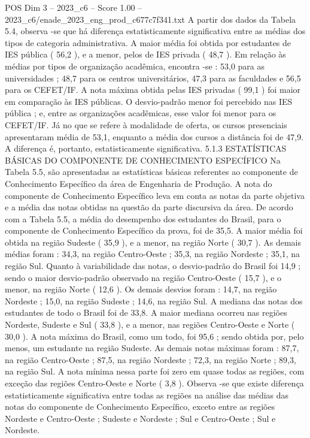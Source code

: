 \begin{textsample}{POS Dim 3 – 2023\_c6 – Score 1.00 – 2023\_c6/enade\_2023\_eng\_prod\_c677c7f341.txt}
A partir dos dados da Tabela 5.4, observa -se que há diferença estatisticamente significativa entre as médias dos tipos de categoria administrativa.
A maior média foi obtida por estudantes de IES pública ( 56,2 ), e a menor, pelos de IES privada ( 48,7 ).
Em relação às médias por tipos de organização acadêmica, encontra -se : 53,0 para as universidades ; 48,7 para os centros universitários, 47,3 para as faculdades e 56,5 para os CEFET/IF.
A nota máxima obtida pelas IES privadas ( 99,1 ) foi maior em comparação às IES públicas.
O desvio-padrão menor foi percebido nas IES pública ; e, entre as organizações acadêmicas, esse valor foi menor para os CEFET/IF.
Já no que se refere à modalidade de oferta, os cursos presenciais apresentaram média de 53,1, enquanto a média dos cursos a distância foi de 47,9.
A diferença é, portanto, estatisticamente significativa. 5.1.3 ESTATÍSTICAS BÁSICAS DO COMPONENTE DE CONHECIMENTO ESPECÍFICO Na Tabela 5.5, são apresentadas as estatísticas básicas referentes ao componente de Conhecimento Específico da área de Engenharia de Produção.
A nota do componente de Conhecimento Específico leva em conta as notas da parte objetiva e a média das notas obtidas na questão da parte discursiva da área.
De acordo com a Tabela 5.5, a média do desempenho dos estudantes do Brasil, para o componente de Conhecimento Específico da prova, foi de 35,5.
A maior média foi obtida na região Sudeste ( 35,9 ), e a menor, na região Norte ( 30,7 ).
As demais médias foram : 34,3, na região Centro-Oeste ; 35,3, na região Nordeste ; 35,1, na região Sul.
Quanto à variabilidade das notas, o desvio-padrão do Brasil foi 14,9 ; sendo o maior desvio-padrão observado na região Centro-Oeste ( 15,7 ), e o menor, na região Norte ( 12,6 ).
Os demais desvios foram : 14,7, na região Nordeste ; 15,0, na região Sudeste ; 14,6, na região Sul.
A mediana das notas dos estudantes de todo o Brasil foi de 33,8.
A maior mediana ocorreu nas regiões Nordeste, Sudeste e Sul ( 33,8 ), e a menor, nas regiões Centro-Oeste e Norte ( 30,0 ).
A nota máxima do Brasil, como um todo, foi 95,6 ; sendo obtida por, pelo menos, um estudante na região Sudeste.
As demais notas máximas foram : 87,7, na região Centro-Oeste ; 87,5, na região Nordeste ; 72,3, na região Norte ; 89,3, na região Sul.
A nota mínima nessa parte foi zero em quase todas as regiões, com exceção das regiões Centro-Oeste e Norte ( 3,8 ).
Observa -se que existe diferença estatisticamente significativa entre todas as regiões na análise das médias das notas do componente de Conhecimento Específico, exceto entre as regiões Nordeste e Centro-Oeste ; Sudeste e Nordeste ; Sul e Centro-Oeste ; Sul e Nordeste.

\end{textsample}
